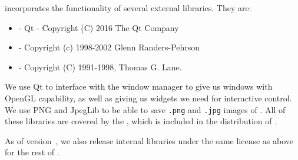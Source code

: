 \map{} incorporates the functionality of several external libraries.  They
are:
\begin{itemize}
  \item {} - Qt -
    Copyright (C) 2016 The Qt Company
  \item {} - Copyright (c)
    1998-2002 Glenn Randers-Pehrson 
  \item {} - Copyright (C)
    1991-1998, Thomas G. Lane.
\end{itemize}

We use Qt to interface with the window manager to give us
windows with OpenGL capability, as well as giving us widgets we need for
interactive control.  We use PNG and JpegLib to be able to save
\texttt{.png} and \texttt{.jpg} images of \map{}.
All of these libraries are covered by the , which is included in the
distribution of \map{}.

As of version~\version{}, we also release internal libraries under the
same license as above for the rest of \map{}.  



